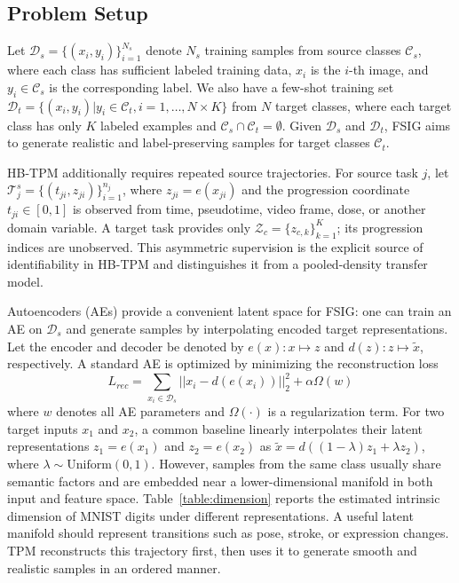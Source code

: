 \documentclass[preprint,12pt,number]{elsarticle}
\def\V#1{\boldsymbol{\mathit#1}}          %
\def\Cal#1{\mathcal#1}
\begin{document}
\subsection{Problem Setup}
Let $\Cal{D}_s = \{ (\V{x}_i, y_i)\}_{i=1}^{N_s}$ denote $N_s$ training samples from source classes $\Cal{C}_s$, where each class has sufficient labeled training data, $\V{x}_i$ is the $i$-th image, and $y_i \in \Cal{C}_s$ is the corresponding label. We also have a few-shot training set $\Cal{D}_t = \{(\V{x}_i, y_i) | y_i \in \Cal{C}_t, i=1,\ldots, N\times K\}$ from $N$ target classes, where each target class has only $K$ labeled examples and $\Cal{C}_s \cap \Cal{C}_t = \emptyset$. Given $\Cal{D}_s$ and $\Cal{D}_t$, FSIG aims to generate realistic and label-preserving samples for target classes $\Cal{C}_t$. 

HB-TPM additionally requires repeated source trajectories. For source task $j$, let $\Cal{T}_j^s=\{(t_{ji},z_{ji})\}_{i=1}^{n_j}$, where $z_{ji}=e(x_{ji})$ and the progression coordinate $t_{ji}\in[0,1]$ is observed from time, pseudotime, video frame, dose, or another domain variable. A target task provides only $\Cal{Z}_c=\{z_{c,k}\}_{k=1}^{K}$; its progression indices are unobserved. This asymmetric supervision is the explicit source of identifiability in HB-TPM and distinguishes it from a pooled-density transfer model.

Autoencoders (AEs) provide a convenient latent space for FSIG: one can train an AE on $\Cal{D}_s$ and generate samples by interpolating encoded target representations. Let the encoder and decoder be denoted by $e(\V{x}): \V{x} \mapsto \V{z}$ and $d(\V{z}):\V{z} \mapsto \tilde{\V{x}}$, respectively. A standard AE is optimized by minimizing the reconstruction loss
\begin{equation}
	L_{rec} = \sum_{\V{x}_i \in \Cal{D}_s} || \V{x}_i - d(e(\V{x}_i))||_2^2 + \alpha \Omega(\V{w}) 
\end{equation}
where $\V{w}$ denotes all AE parameters and $\Omega(\cdot)$ is a regularization term. For two target inputs $\V{x}_1$ and $\V{x}_2$, a common baseline linearly interpolates their latent representations $\V{z}_1=e(\V{x}_1)$ and $\V{z}_2=e(\V{x}_2)$ as $\tilde{\V{x}} = d((1-\lambda)\V{z}_1+\lambda\V{z}_2)$, where $\lambda\sim \mathrm{Uniform}(0,1)$. However, samples from the same class usually share semantic factors and are embedded near a lower-dimensional manifold in both input and feature space. Table~\ref{table:dimension} reports the estimated intrinsic dimension of MNIST digits under different representations. A useful latent manifold should represent transitions such as pose, stroke, or expression changes. TPM reconstructs this trajectory first, then uses it to generate smooth and realistic samples in an ordered manner.
\end{document}

